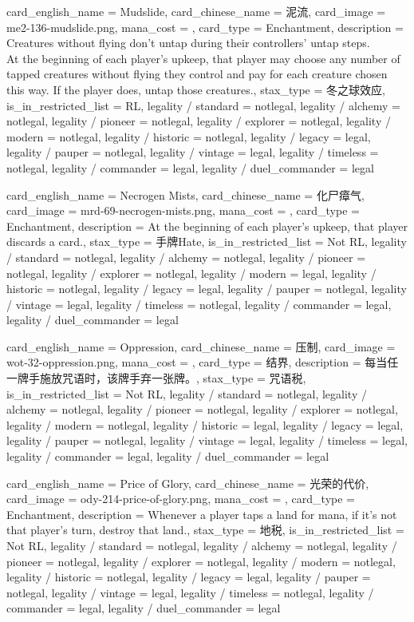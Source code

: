 \documentclass[lang = cn, color = black, 10pt]{AllThatStax}
\begin{document}
\card
{
	card_english_name = {Mudslide},
	card_chinese_name = {泥流},
	card_image = me2-136-mudslide.png,
	mana_cost = ,
	card_type = Enchantment,
	description = {Creatures without flying don't untap during their controllers' untap steps.\\
		At the beginning of each player's upkeep, that player may choose any number of tapped creatures without flying they control and pay  for each creature chosen this way. If the player does, untap those creatures.},
	stax_type = 冬之球效应,
	is_in_restricted_list = RL,
	legality / standard = notlegal,
	legality / alchemy = notlegal,
	legality / pioneer = notlegal,
	legality / explorer = notlegal,
	legality / modern = notlegal,
	legality / historic = notlegal,
	legality / legacy = legal,
	legality / pauper = notlegal,
	legality / vintage = legal,
	legality / timeless = notlegal,
	legality / commander = legal,
	legality / duel_commander = legal
}

\card
{
	card_english_name = {Necrogen Mists},
	card_chinese_name = {化尸瘴气},
	card_image = mrd-69-necrogen-mists.png,
	mana_cost = ,
	card_type = Enchantment,
	description = {At the beginning of each player's upkeep, that player discards a card.},
	stax_type = 手牌Hate,
	is_in_restricted_list = Not RL,
	legality / standard = notlegal,
	legality / alchemy = notlegal,
	legality / pioneer = notlegal,
	legality / explorer = notlegal,
	legality / modern = legal,
	legality / historic = notlegal,
	legality / legacy = legal,
	legality / pauper = notlegal,
	legality / vintage = legal,
	legality / timeless = notlegal,
	legality / commander = legal,
	legality / duel_commander = legal
}

\card
{
	card_english_name = {Oppression},
	card_chinese_name = {压制},
	card_image = wot-32-oppression.png,
	mana_cost = ,
	card_type = 结界,
	description = {每当任一牌手施放咒语时，该牌手弃一张牌。},
	stax_type = 咒语税,
	is_in_restricted_list = Not RL,
	legality / standard = notlegal,
	legality / alchemy = notlegal,
	legality / pioneer = notlegal,
	legality / explorer = notlegal,
	legality / modern = notlegal,
	legality / historic = legal,
	legality / legacy = legal,
	legality / pauper = notlegal,
	legality / vintage = legal,
	legality / timeless = legal,
	legality / commander = legal,
	legality / duel_commander = legal
}

\card
{
	card_english_name = {Price of Glory},
	card_chinese_name = {光荣的代价},
	card_image = ody-214-price-of-glory.png,
	mana_cost = ,
	card_type = Enchantment,
	description = {Whenever a player taps a land for mana, if it's not that player's turn, destroy that land.},
	stax_type = 地税,
	is_in_restricted_list = Not RL,
	legality / standard = notlegal,
	legality / alchemy = notlegal,
	legality / pioneer = notlegal,
	legality / explorer = notlegal,
	legality / modern = notlegal,
	legality / historic = notlegal,
	legality / legacy = legal,
	legality / pauper = notlegal,
	legality / vintage = legal,
	legality / timeless = notlegal,
	legality / commander = legal,
	legality / duel_commander = legal
}
\end{document}
